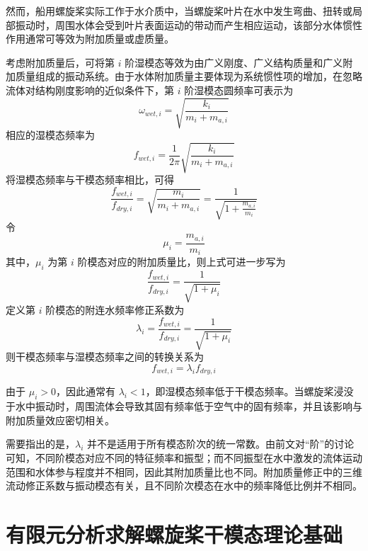 然而，船用螺旋桨实际工作于水介质中，当螺旋桨叶片在水中发生弯曲、扭转或局部振动时，周围水体会受到叶片表面运动的带动而产生相应运动，该部分水体惯性作用通常可等效为附加质量或虚质量\cite{sim:20}。

考虑附加质量后，可将第 $i$ 阶湿模态等效为由广义刚度、广义结构质量和广义附加质量组成的振动系统。由于水体附加质量主要体现为系统惯性项的增加，在忽略流体对结构刚度影响的近似条件下，第 $i$ 阶湿模态圆频率可表示为
\begin{equation}
  \omega_{wet,i}=\sqrt{\frac{k_i}{m_i+m_{a,i}}}
\end{equation}
相应的湿模态频率为
\begin{equation}
  f_{wet,i}=\frac{1}{2\pi}\sqrt{\frac{k_i}{m_i+m_{a,i}}}
\end{equation}
将湿模态频率与干模态频率相比，可得
\begin{equation}
  \frac{f_{wet,i}}{f_{dry,i}}=\sqrt{\frac{m_i}{m_i+m_{a,i}}}=\frac{1}{\sqrt{1+\frac{m_{a,i}}{m_i}}}
\end{equation}
令
\begin{equation}
  \mu_i=\frac{m_{a,i}}{m_i}
\end{equation}
其中，$\mu_i$ 为第 $i$ 阶模态对应的附加质量比，则上式可进一步写为
\begin{equation}
  \frac{f_{wet,i}}{f_{dry,i}}=\frac{1}{\sqrt{1+\mu_i}}
\end{equation}
定义第 $i$ 阶模态的附连水频率修正系数为
\begin{equation}
  \lambda_i=\frac{f_{wet,i}}{f_{dry,i}}=\frac{1}{\sqrt{1+\mu_i}}
\end{equation}
则干模态频率与湿模态频率之间的转换关系为
\begin{equation}
  f_{wet,i}=\lambda_i f_{dry,i}
\end{equation}

由于 $\mu_i>0$，因此通常有 $\lambda_i<1$，即湿模态频率低于干模态频率。当螺旋桨浸没于水中振动时，周围流体会导致其固有频率低于空气中的固有频率，并且该影响与附加质量效应密切相关\cite{sim:20,sim:21}。

需要指出的是，$\lambda_i$ 并不是适用于所有模态阶次的统一常数。由前文对“阶”的讨论可知，不同阶模态对应不同的特征频率和振型；而不同振型在水中激发的流体运动范围和水体参与程度并不相同，因此其附加质量比也不同。附加质量修正中的三维流动修正系数与振动模态有关，且不同阶次模态在水中的频率降低比例并不相同\cite{sim:20,sim:21}。

\section{有限元分析求解螺旋桨干模态理论基础}

